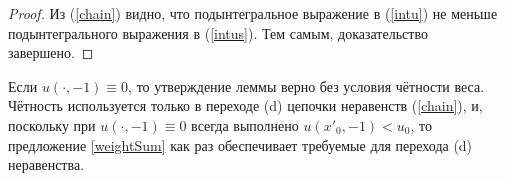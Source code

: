 \begin{proof}
Из (\ref{chain}) видно, что подынтегральное выражение в (\ref{intu}) не меньше
подынтегрального выражения в (\ref{intus}).
Тем самым, доказательство завершено.
\end{proof}

\begin{rem}
\label{landesLinearRem}
Если $u(\cdot, -1) \equiv 0$, то утверждение леммы верно без условия чётности веса.
Чётность используется только в переходе (d) цепочки неравенств (\ref{chain}),
и, поскольку при $u(\cdot, -1) \equiv 0$ всегда выполнено $u(x'_0, -1) < u_0$,
то предложение \ref{weightSum} как раз обеспечивает требуемые для перехода (d) неравенства.
\end{rem}